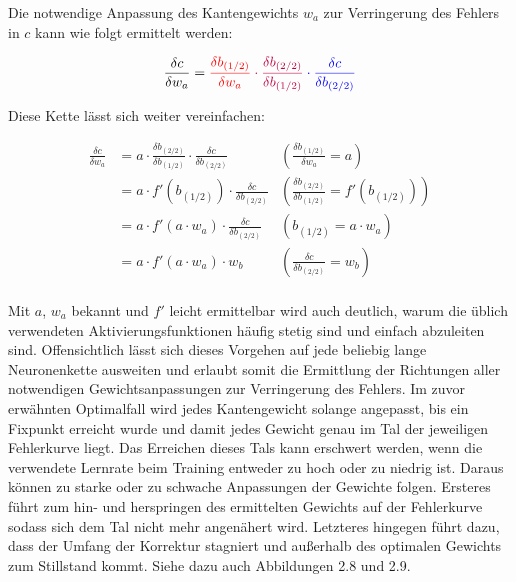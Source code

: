 Die notwendige Anpassung des Kantengewichts $w_a$ zur Verringerung des Fehlers
in $c$ kann wie folgt ermittelt werden:

\[
    \frac{\delta c}{\delta w_a}=\color{red}\frac{\delta b_{(1/2)}}{\delta w_a}\color{purple}\cdot\frac{\delta b_{(2/2)}}{\delta b_{(1/2)}}\color{blue}\cdot\frac{\delta c}{\delta b_{(2/2)}}
\]

Diese Kette lässt sich weiter vereinfachen:

\begin{align*}
    \frac{\delta c}{\delta w_a} & = a\cdot\frac{\delta b_{(2/2)}}{\delta b_{(1/2)}}\cdot\frac{\delta c}{\delta b_{(2/2)}} & \left(\frac{\delta b_{(1/2)}}{\delta w_a} =a\right)                   \\
                                & = a\cdot f'(b_{(1/2)})\cdot\frac{\delta c}{\delta b_{(2/2)}}                            & \left(\frac{\delta b_{(2/2)}}{\delta b_{(1/2)}} =f'(b_{(1/2)})\right) \\
                                & = a\cdot f'(a\cdot w_a)\cdot\frac{\delta c}{\delta b_{(2/2)}}                           & \left(b_{(1/2)} =a\cdot w_a\right)                                    \\
                                & = a\cdot f'(a\cdot w_a)\cdot w_b                                                        & \left(\frac{\delta c}{\delta b_{(2/2)}} =w_b\right)                   \\
\end{align*}

Mit $a$, $w_a$ bekannt und $f'$ leicht ermittelbar wird auch deutlich, warum
die üblich verwendeten Aktivierungsfunktionen häufig stetig sind und einfach
abzuleiten sind.
Offensichtlich lässt sich dieses Vorgehen auf jede beliebig lange Neuronenkette
ausweiten und erlaubt somit die Ermittlung der Richtungen aller notwendigen
Gewichtsanpassungen zur Verringerung des Fehlers.
Im zuvor erwähnten Optimalfall wird jedes Kantengewicht solange angepasst,
bis ein Fixpunkt erreicht wurde und damit jedes Gewicht genau im Tal der
jeweiligen Fehlerkurve liegt. Das Erreichen dieses Tals kann erschwert werden,
wenn die verwendete Lernrate beim Training entweder zu hoch oder zu niedrig ist.
Daraus können zu starke oder zu schwache Anpassungen der Gewichte folgen.
Ersteres führt zum hin- und herspringen des ermittelten Gewichts auf der
Fehlerkurve sodass sich dem Tal nicht mehr angenähert wird.
Letzteres hingegen führt dazu, dass der Umfang der Korrektur stagniert und
außerhalb des optimalen Gewichts zum Stillstand kommt.
Siehe dazu auch Abbildungen 2.8 und 2.9.

